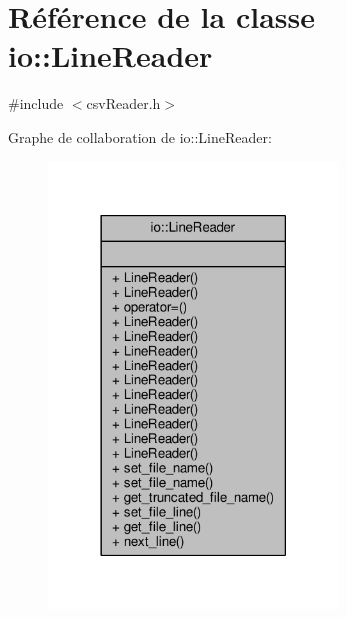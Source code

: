 \hypertarget{classio_1_1LineReader}{}\section{Référence de la classe io\+:\+:Line\+Reader}
\label{classio_1_1LineReader}


{\ttfamily \#include $<$csv\+Reader.\+h$>$}



Graphe de collaboration de io\+:\+:Line\+Reader\+:\nopagebreak
\begin{figure}[H]
\begin{center}
\leavevmode
\includegraphics[width=218pt]{classio_1_1LineReader__coll__graph}
\end{center}
\end{figure}
